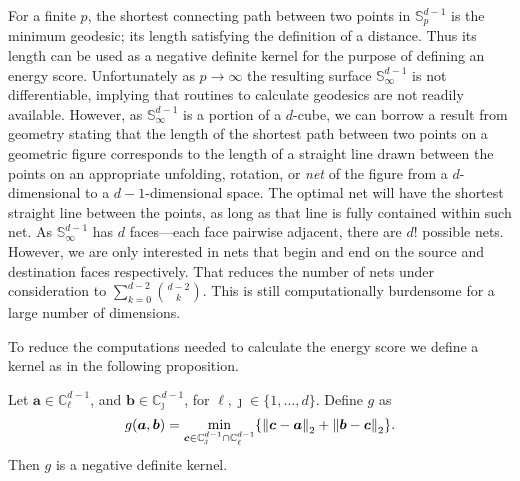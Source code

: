 For a finite $p$, the shortest connecting path between two points in ${\mathbb S}_p^{d-1}$
  is the minimum geodesic; its length satisfying the definition of a distance.  Thus its
  length can be used as a negative definite kernel for the purpose of defining an energy
  score. Unfortunately as $p\to\infty$ the resulting surface ${\mathbb S}_{\infty}^{d-1}$
  is not differentiable, implying that routines to calculate geodesics are not readily
  available.  However, as ${\mathbb S}_{\infty}^{d-1}$ is a portion of a $d$-cube, we
  can borrow a result from geometry \citep{pappas1989} stating that the length of the
  shortest path between two points on a geometric figure corresponds to the length of a
  straight line drawn between the points on an appropriate unfolding, rotation, or \emph{net} of the figure from a $d$-dimensional to a $d-1$-dimensional space.  The optimal net will have the shortest straight line between the points, as long as that line is fully contained within such net. As ${\mathbb S}_{\infty}^{d-1}$ has $d$ faces---each face pairwise adjacent, there are $d!$ possible nets.  However, we are only interested in nets that begin and end on the source and destination faces respectively.  That reduces the number of nets under consideration to $\sum_{k = 0}^{d-2}\binom{d-2}{k}$.  This is still computationally burdensome for a large number of dimensions.  

To reduce the computations needed to calculate the energy score we define a kernel as 
in the following proposition.
\begin{prop}\label{prop:g}
Let $\bm{a} \in {\mathbb C}_{\ell}^{d-1}$, and $\bm{b} \in {\mathbb C}_{\jmath}^{d-1}$, for $\ell, \jmath \in \{1, \ldots , d\}$. Define $g$ as
\[  
    g(\bm{a},\bm{b}) = \min_{\bm{c} \in{\mathbb C}_{\jmath}^{d-1}\cap{\mathbb C}_{\ell}^{d-1}}\left\{ 
        \pnorm{\bm{c}-\bm{a}}{2} + \pnorm{\bm{b}-\bm{c}}{2} \right\}.
\]
Then $g$  is a negative definite kernel.
\end{prop}

